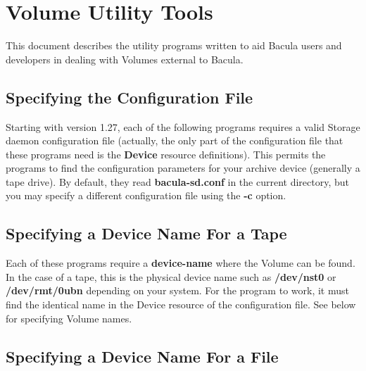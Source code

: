 
\section*{Volume Utility Tools}
\label{_ChapterStart9}

This document describes the utility programs written to aid Bacula users and
developers in dealing with Volumes external to Bacula. 

\subsection*{Specifying the Configuration File}

Starting with version 1.27, each of the following programs requires a valid
Storage daemon configuration file (actually, the only part of the
configuration file that these programs need is the {\bf Device} resource
definitions). This permits the programs to find the configuration parameters
for your archive device (generally a tape drive). By default, they read {\bf
bacula-sd.conf} in the current directory, but you may specify a different
configuration file using the {\bf -c} option. 

\subsection*{Specifying a Device Name For a Tape}

Each of these programs require a {\bf device-name} where the Volume can be
found. In the case of a tape, this is the physical device name such as {\bf
/dev/nst0} or {\bf /dev/rmt/0ubn} depending on your system. For the program to
work, it must find the identical name in the Device resource of the
configuration file. See below for specifying Volume names. 

\subsection*{Specifying a Device Name For a File}

